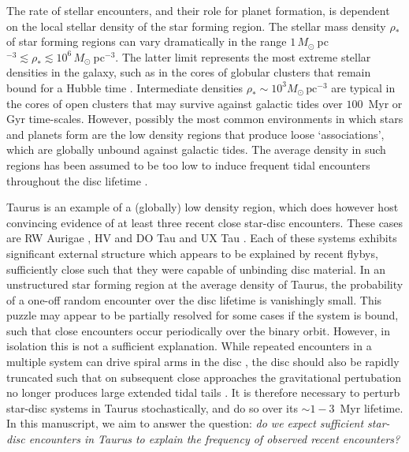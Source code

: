 \documentclass{aa}
\begin{document}
The rate of stellar encounters, and their role for planet formation, is dependent on the local stellar density of the star forming region.
The stellar mass density $ \rho_* $ of star forming regions can vary dramatically in the range $1\, M_\odot~$pc$^{-3} \lesssim \rho_*\lesssim 10^6 \, M_\odot~$pc$^{-3}$. 
The latter limit represents the most extreme stellar densities in the galaxy, such as in the cores of globular clusters that remain bound for a Hubble time  \citep[e.g.][]{Krumholz19}. 
Intermediate densities $\rho_*\sim  10^3 M_\odot\,\mathrm{pc}^{-3}$ are typical in the cores of open clusters that may survive against galactic tides over $100$~Myr or Gyr time-scales. 
However, possibly the most common environments in which stars and planets form are the low density regions that produce loose `associations', which are globally unbound against galactic tides. 
The average density in such regions has been assumed to be too low to induce frequent tidal encounters throughout the disc lifetime \citep[e.g.][]{Winter18b}.




Taurus is an example of a (globally) low density region, which does however host convincing evidence of at least three recent close star-disc encounters. 
These cases are RW Aurigae \citep{Cabrit06, Dai15, Rodriguez18}, HV and DO Tau \citep{Howard13, Winter18c} and UX Tau \citep{Zapata20, Menard20}.
Each of these systems exhibits significant external structure which appears to be explained by recent flybys, sufficiently close such that they were capable of unbinding disc material. 
In an unstructured star forming region at the average density of Taurus, the probability of a one-off random encounter over the disc lifetime is vanishingly small.
This puzzle may appear to be partially resolved for some cases if the system is bound, such that close encounters occur periodically over the binary orbit.
However, in isolation this is not a sufficient explanation. While repeated encounters in a multiple system can drive spiral arms in the disc \citep[e.g.][]{Alaguero24}, the disc should also be rapidly truncated such that on subsequent close approaches the gravitational pertubation no longer produces large extended tidal tails \citep[e.g.][]{Menard20}. 
It is therefore necessary to perturb star-disc systems in Taurus stochastically, and do so over its $\sim 1{-}3$~Myr lifetime. In this manuscript, we aim to answer the question: \textit{do we expect sufficient star-disc encounters in Taurus to explain the frequency of observed recent encounters?}
\end{document}
